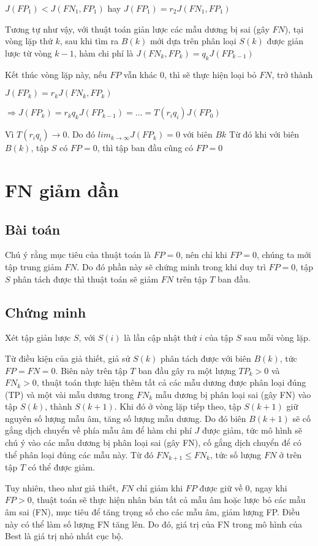 \documentclass[./../main.tex]{subfiles}
\begin{document}
$J(FP_1) < J(FN_1, FP_1)$ hay $J(FP_1) = r_2 J(FN_1,FP_1)$

Tương tự như vậy, với thuật toán giản lược các mẫu dương bị sai (gây $FN$), tại vòng lặp thứ $k$, sau khi tìm ra $B(k)$ mới dựa trên phân loại $S(k)$ được giản lược từ vòng $k-1$, hàm chi phí là $J(FN_k, FP_k) = q_k J(FP_{k-1})$

Kết thúc vòng lặp này, nếu $FP$ vẫn khác 0, thì sẽ thực hiện loại bỏ $FN$, trở thành


$J(FP_k) = r_k J(FN_k, FP_k)$


$\Rightarrow J(FP_k) = r_k q_k J(FP_{k-1}) = \ldots = T(r_i q_i)J(FP_0)$

Vì $T(r_i q_i) \rightarrow 0$. Do đó $lim_{k \to \infty} J(FP_k) = 0$ với biên $Bk$
Từ đó khi với biên $B(k)$, tập $S$ có $FP = 0$, thì tập ban đầu cũng có $FP=0$

\section{FN giảm dần}

\subsection*{Bài toán}
Chú ý rằng mục tiêu của thuật toán là $FP = 0$, nên chỉ khi $FP=0$, chúng ta mới tập trung giảm $FN$. Do đó phần này sẽ chứng minh trong khi duy trì $FP=0$, tập $S$ phân tách được thì thuật toán sẽ giảm $FN$ trên tập $T$ ban đầu.
\subsection*{Chứng minh}
Xét tập giản lược $S$, với $S(i)$ là lần cập nhật thứ $i$ của tập $S$ sau mỗi vòng lặp.

Từ điều kiện của giả thiết, giả sử $S(k)$ phân tách được với biên $B(k)$, tức $FP=FN=0$. Biên này trên tập $T$ ban đầu gây ra một lượng $TP_k>0$ và $FN_k>0$, thuật toán thực hiện thêm tất cả các mẫu dương được phân loại đúng (TP) và một vài mẫu dương trong $FN_k$ mẫu dương bị phân loại sai (gây FN) vào tập $S(k)$, thành $S(k+1)$. Khi đó ở vòng lặp tiếp theo, tập $S(k+1)$ giữ nguyên số lượng mẫu âm, tăng số lượng mẫu dương. Do đó biên $B(k+1)$ sẽ cố gắng dịch chuyển về phía mẫu âm để hàm chi phí $J$ được giảm, tức mô hình sẽ chú ý vào các mẫu dương bị phân loại sai (gây FN), cố gắng dịch chuyển để có thể phân loại đúng các mẫu này. Từ đó $FN_{k+1} \leq FN_k$, tức số lượng $FN$ ở trên tập $T$ có thể được giảm.

Tuy nhiên, theo như giả thiết, $FN$ chỉ giảm khi $FP$ được giữ về 0, ngay khi $FP >0$, thuật toán sẽ thực hiện nhân bản tất cả mẫu âm hoặc lược bỏ các mẫu âm sai (FN), mục tiêu để tăng trọng số cho các mẫu âm, giảm lượng FP. Điều này có thể làm số lượng FN tăng lên. Do đó, giá trị của FN trong mô hình của Best là giá trị nhỏ nhất cục bộ.
\end{document}
